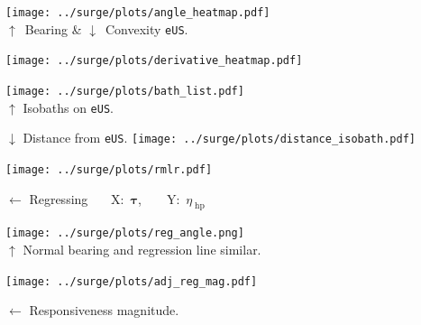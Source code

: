\begin{frame}{}

\begin{minipage}{0.45\linewidth}

\texttt{[image: ../surge/plots/angle\_heatmap.pdf]}\\
$\uparrow$~Bearing \& $\downarrow$~Convexity \texttt{eUS}.

\texttt{[image: ../surge/plots/derivative\_heatmap.pdf]}

\end{minipage} \begin{minipage}{0.45\linewidth}
\raggedleft
\texttt{[image: ../surge/plots/bath\_list.pdf]}\\
{$\uparrow$ Isobaths on \texttt{eUS}.}

{$\downarrow$ Distance from \texttt{eUS}.}
\texttt{[image: ../surge/plots/distance\_isobath.pdf]}\\

\end{minipage}

\end{frame}

\begin{frame}
\begin{minipage}{0.6\linewidth}
\texttt{[image: ../surge/plots/rmlr.pdf]}

\label{fig:tau-tau-resp}
\end{minipage}
\begin{minipage}{0.3\linewidth}
\raggedright
{$\leftarrow$ Regressing
  \Large{~~~X:~$\boldsymbol{\tau}$,~~~~Y:~$\eta_{\;\mathrm{hp}}$}}
\hspace{50pt}

\raggedleft
\texttt{[image: ../surge/plots/reg\_angle.png]}\\
{$\uparrow$ Normal bearing and regression line similar.}
\end{minipage}

 \label{fig:tau-tau-angle}
 \begin{minipage}{0.6\linewidth}
 \texttt{[image: ../surge/plots/adj\_reg\_mag.pdf]}
 \end{minipage}
 \begin{minipage}{0.3\linewidth}
 {$\leftarrow$ Responsiveness magnitude.}
 \end{minipage}
\end{frame}

